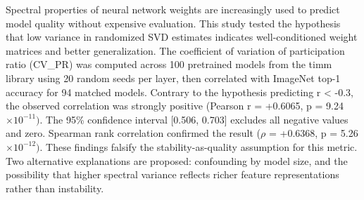 
Spectral properties of neural network weights are increasingly used to predict model quality without expensive evaluation. This study tested the hypothesis that low variance in randomized SVD estimates indicates well-conditioned weight matrices and better generalization. The coefficient of variation of participation ratio (CV\_PR) was computed across 100 pretrained models from the timm library using 20 random seeds per layer, then correlated with ImageNet top-1 accuracy for 94 matched models. Contrary to the hypothesis predicting r < -0.3, the observed correlation was strongly positive (Pearson r = +0.6065, p = 9.24 $\times 10^{-11})$. The 95\% confidence interval [0.506, 0.703] excludes all negative values and zero. Spearman rank correlation confirmed the result ($\rho$ = +0.6368, p = 5.26 $\times 10^{-12})$. These findings falsify the stability-as-quality assumption for this metric. Two alternative explanations are proposed: confounding by model size, and the possibility that higher spectral variance reflects richer feature representations rather than instability.
